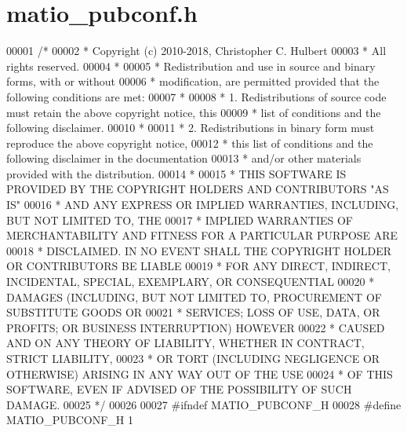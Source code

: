 \hypertarget{matio__pubconf_8h_source}{}\section{matio\+\_\+pubconf.\+h}
\label{matio__pubconf_8h_source}

\begin{DoxyCode}
00001 \textcolor{comment}{/*}
00002 \textcolor{comment}{ * Copyright (c) 2010-2018, Christopher C. Hulbert}
00003 \textcolor{comment}{ * All rights reserved.}
00004 \textcolor{comment}{ *}
00005 \textcolor{comment}{ * Redistribution and use in source and binary forms, with or without}
00006 \textcolor{comment}{ * modification, are permitted provided that the following conditions are met:}
00007 \textcolor{comment}{ *}
00008 \textcolor{comment}{ * 1. Redistributions of source code must retain the above copyright notice, this}
00009 \textcolor{comment}{ *    list of conditions and the following disclaimer.}
00010 \textcolor{comment}{ *}
00011 \textcolor{comment}{ * 2. Redistributions in binary form must reproduce the above copyright notice,}
00012 \textcolor{comment}{ *    this list of conditions and the following disclaimer in the documentation}
00013 \textcolor{comment}{ *    and/or other materials provided with the distribution.}
00014 \textcolor{comment}{ *}
00015 \textcolor{comment}{ * THIS SOFTWARE IS PROVIDED BY THE COPYRIGHT HOLDERS AND CONTRIBUTORS "AS IS"}
00016 \textcolor{comment}{ * AND ANY EXPRESS OR IMPLIED WARRANTIES, INCLUDING, BUT NOT LIMITED TO, THE}
00017 \textcolor{comment}{ * IMPLIED WARRANTIES OF MERCHANTABILITY AND FITNESS FOR A PARTICULAR PURPOSE ARE}
00018 \textcolor{comment}{ * DISCLAIMED. IN NO EVENT SHALL THE COPYRIGHT HOLDER OR CONTRIBUTORS BE LIABLE}
00019 \textcolor{comment}{ * FOR ANY DIRECT, INDIRECT, INCIDENTAL, SPECIAL, EXEMPLARY, OR CONSEQUENTIAL}
00020 \textcolor{comment}{ * DAMAGES (INCLUDING, BUT NOT LIMITED TO, PROCUREMENT OF SUBSTITUTE GOODS OR}
00021 \textcolor{comment}{ * SERVICES; LOSS OF USE, DATA, OR PROFITS; OR BUSINESS INTERRUPTION) HOWEVER}
00022 \textcolor{comment}{ * CAUSED AND ON ANY THEORY OF LIABILITY, WHETHER IN CONTRACT, STRICT LIABILITY,}
00023 \textcolor{comment}{ * OR TORT (INCLUDING NEGLIGENCE OR OTHERWISE) ARISING IN ANY WAY OUT OF THE USE}
00024 \textcolor{comment}{ * OF THIS SOFTWARE, EVEN IF ADVISED OF THE POSSIBILITY OF SUCH DAMAGE.}
00025 \textcolor{comment}{ */}
00026 
00027 \textcolor{preprocessor}{#ifndef MATIO\_PUBCONF\_H}
00028 \textcolor{preprocessor}{#define MATIO\_PUBCONF\_H 1}

\end{DoxyCode}
